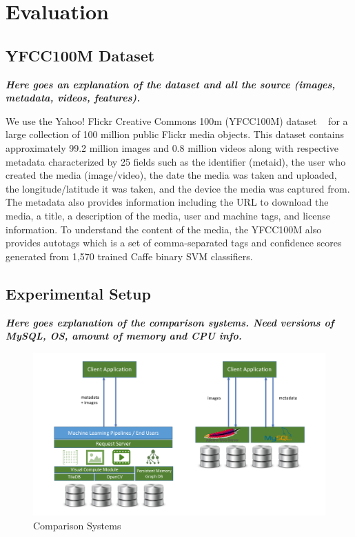 \section{Evaluation}
\label{eval}

\subsection{YFCC100M Dataset}
\label{dataset}

\textbf{\textit{Here goes an explanation of the dataset and all the source
(images, metadata, videos, features).}}

We use the Yahoo! Flickr Creative Commons 100m (YFCC100M) dataset ~\cite{Thomee_2016} for a large collection of 100 million public Flickr media objects.  This dataset contains approximately 99.2 million images and 0.8 million videos along with respective metadata characterized by 25 fields such as the identifier (metaid), the user who created the media (image/video), the date the media was taken and uploaded, the longitude/latitude it was taken, and the device the media was captured from.  The metadata also provides information including the URL to download the media, a title, a description of the media, user and machine tags, and license information.  To understand the content of the media, the YFCC100M also provides autotags which is a set of comma-separated tags and confidence scores generated from 1,570 trained Caffe binary SVM classifiers.  

\subsection{Experimental Setup}

\textbf{\textit{Here goes explanation of the comparison systems.
Need versions of MySQL, OS, amount of memory and CPU info.}}

\begin{figure}[]
\centering
\includegraphics[width=\textwidth]{figures/comparison_system}
\caption{Comparison Systems}
\label{fig:systems}
\end{figure}


